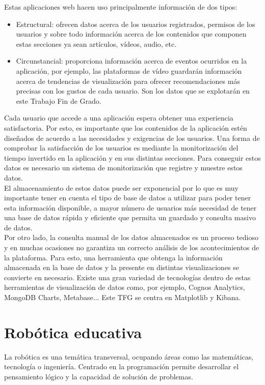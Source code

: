 \documentclass[a4paper, 12pt]{book}
\begin{document}
		Estas aplicaciones web hacen uso principalmente información de dos tipos:
		\begin{itemize}
			\item Estructural: ofrecen datos acerca de los usuarios registrados, permisos de los usuarios y sobre todo información acerca de los contenidos que componen estas secciones ya sean artículos, vídeos, audio, etc.
			
			\item Circunstancial: proporciona información acerca de eventos ocurridos en la aplicación, por ejemplo, las plataformas de vídeo guardarán información acerca de tendencias de visualización para ofrecer recomendaciones más precisas con los gustos de cada usuario. Son los datos que se explotarán en este Trabajo Fin de Grado.
		\end{itemize}
		
		Cada usuario que accede a una aplicación espera obtener una experiencia satisfactoria. Por esto, es importante que los contenidos de la aplicación estén diseñados de acuerdo a las necesidades y exigencias de los usuarios. Una forma de comprobar la satisfacción de los usuarios es mediante la monitorización del tiempo invertido en la aplicación y en sus distintas secciones. Para conseguir estos datos es necesario un sistema de monitorización que registre y muestre estos datos. \\
		
		El almacenamiento de estos datos puede ser exponencial por lo que es muy importante tener en cuenta el tipo de base de datos a utilizar para poder tener esta información disponible, a mayor número de usuarios más necesidad de tener una base de datos rápida y eficiente que permita un guardado y consulta masivo de datos. \\
		
		Por otro lado, la consulta manual de los datos almacenados es un proceso tedioso y en muchas ocasiones no garantiza un correcto análisis de los acontecimientos de la plataforma. Para esto, una herramienta que obtenga la información almacenada en la base de datos y la presente en distintas visualizaciones se convierte en necesario. Existe una gran variedad de tecnologías dentro de estas herramientas de visualización de datos como, por ejemplo, Cognos Analytics, MongoDB Charts, Metabase... Este TFG se centra en Matplotlib y Kibana.
	
	
	\section{Robótica educativa}
	\label{sec:1_robotica_edicativa}
		La robótica es una temática transversal, ocupando áreas como las matemáticas, tecnología o ingeniería. Centrado en la programación permite desarrollar el pensamiento lógico y la capacidad de solución de problemas. \\
		
\end{document}
